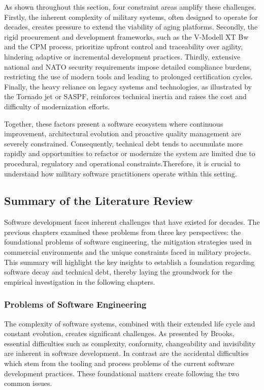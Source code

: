 As shown throughout this section, four constraint areas amplify these challenges. Firstly, the inherent complexity of military systems, often designed to operate for decades, creates pressure to extend the viability of aging platforms.
Secondly, the rigid procurement and development frameworks, such as the V-Modell XT Bw and the \ac{CPM} process, prioritize upfront control and traceability over agility, hindering adaptive or incremental development practices.
Thirdly, extensive national and NATO security requirements impose detailed compliance burdens, restricting the use of modern tools and leading to prolonged certification cycles. Finally, the heavy reliance on legacy systems and technologies, as illustrated by the Tornado jet or SASPF, 
reinforces technical inertia and raises the cost and difficulty of modernization efforts.

Together, these factors present a software ecosystem where continuous improvement, architectural evolution and proactive quality management are severely constrained. Consequently, technical debt tends to accumulate more rapidly and opportunities to refactor or modernize the system are limited due to
procedural, regulatory and operational constraints.Therefore, it is crucial to understand how military software practitioners operate within this setting.

\subsection{Summary of the Literature Review}
Software development faces inherent challenges that have existed for decades. The previous chapters examined these problems from three key perspectives: the foundational problems of software engineering, the mitigation strategies used in commercial environments and the unique constraints faced in military projects.
This summary will highlight the key insights to establish a foundation regarding software decay and technical debt, thereby laying the groundwork for the empirical investigation in the following chapters.

\subsubsection{Problems of Software Engineering}
The complexity of software systems, combined with their extended life cycle and constant evolution, creates significant challenges. As presented by Brooks, essential difficulties such as complexity, conformity, changeability and invisibility are inherent in software development.
In contrast are the accidental difficulties which stem from the tooling and process problems of the current software development practices.
These foundational matters create following the two common issues.

